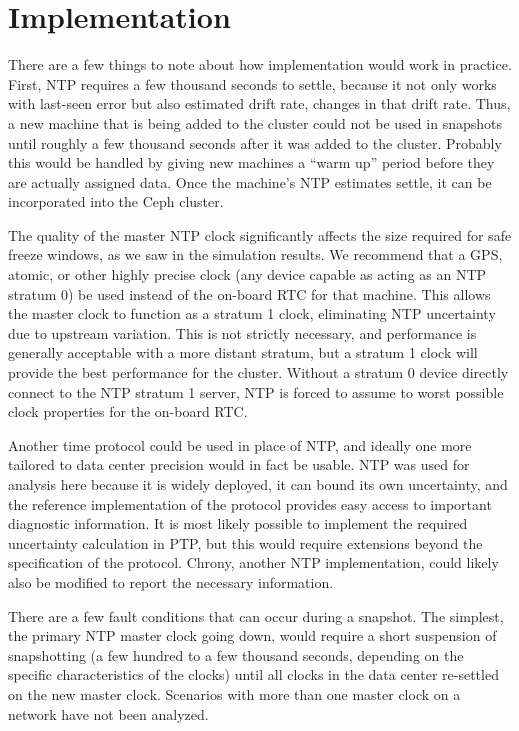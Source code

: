 \chapter{Implementation}
\label{sec:impl}

There are a few things to note about how implementation would work in
practice. First, NTP requires a few thousand seconds to settle,
because it not only works with last-seen error but also estimated
drift rate, changes in that drift rate. Thus, a new machine that is
being added to the cluster could not be used in snapshots until
roughly a few thousand seconds after it was added to the
cluster. Probably this would be handled by giving new machines a “warm
up” period before they are actually assigned data. Once the machine's
NTP estimates settle, it can be incorporated into the Ceph cluster.

The quality of the master NTP clock significantly affects the size
required for safe freeze windows, as we saw in the simulation
results. We recommend that a GPS, atomic, or other highly precise
clock (any device capable as acting as an NTP stratum 0) be used
instead of the on-board RTC for that machine. This allows the master
clock to function as a stratum 1 clock, eliminating NTP uncertainty
due to upstream variation. This is not strictly necessary, and
performance is generally acceptable with a more distant stratum, but a
stratum 1 clock will provide the best performance for the
cluster. Without a stratum 0 device directly connect to the NTP
stratum 1 server, NTP is forced to assume to worst possible clock
properties for the on-board RTC.

Another time protocol could be used in place of NTP, and ideally one
more tailored to data center precision would in fact be usable. NTP
was used for analysis here because it is widely deployed, it can bound
its own uncertainty, and the reference implementation of the protocol
provides easy access to important diagnostic information. It is most
likely possible to implement the required uncertainty calculation in
PTP, but this would require extensions beyond the specification of the
protocol. Chrony, another NTP implementation, could likely also be
modified to report the necessary information.

There are a few fault conditions that can occur during a snapshot. The
simplest, the primary NTP master clock going down, would require a
short suspension of snapshotting (a few hundred to a few thousand
seconds, depending on the specific characteristics of the clocks)
until all clocks in the data center re-settled on the new master
clock. Scenarios with more than one master clock on a network have not
been analyzed.

